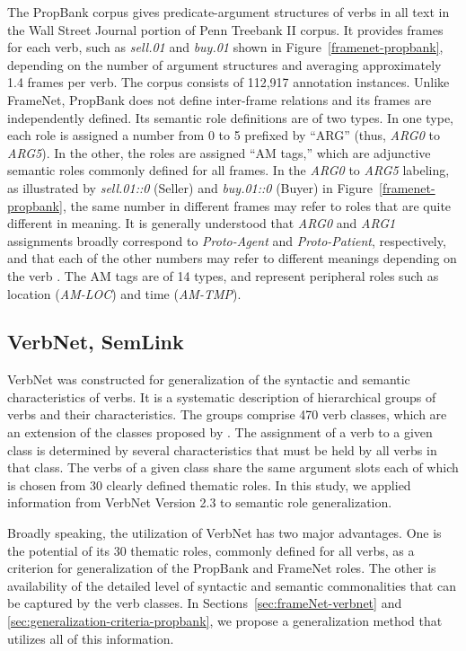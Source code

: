 \documentclass[english]{jnlp_1.4_rep}
\begin{document}
The PropBank corpus gives predicate-argument structures of verbs in all text in the Wall Street Journal portion of Penn Treebank II corpus. It provides frames for each verb, such as {\it sell.01} and {\it buy.01} shown in Figure~\ref{framenet-propbank}, depending on the number of argument structures and averaging approximately 1.4 frames per verb. The corpus consists of 112,917 annotation instances. Unlike FrameNet, PropBank does not define inter-frame relations and its frames are independently defined. Its semantic role definitions are of two types. In one type, each role is assigned a number from 0 to 5 prefixed by ``ARG'' (thus, {\it ARG0} to {\it ARG5}). In the other, the roles are assigned ``AM tags,'' which are adjunctive semantic roles commonly defined for all frames. In the {\it ARG0} to {\it ARG5} labeling, as illustrated by {\it sell.01::0} (Seller) and {\it buy.01::0} (Buyer) in Figure~\ref{framenet-propbank}, the same number in different frames may refer to roles that are quite different in meaning. It is generally understood that {\it ARG0} and {\it ARG1} assignments broadly correspond to {\it Proto-Agent} and {\it Proto-Patient}, respectively, and that each of the other numbers may refer to different meanings depending on the verb \cite{Palmer:05,yi-loper-palmer:2007:main}. The AM tags are of 14 types, and represent peripheral roles such as location ({\it AM-LOC}) and time ({\it AM-TMP}).


\subsection{VerbNet, SemLink}
\label{sec:verbnet}

VerbNet \cite{kipper2000cbc} was constructed for generalization of the syntactic and semantic characteristics of verbs. It is a systematic description of hierarchical groups of verbs and their characteristics. The groups comprise 470 verb classes, which are an extension of the classes proposed by . The assignment of a verb to a given class is determined by several characteristics that must be held by all verbs in that class. The verbs of a given class share the same argument slots each of which is chosen from 30 clearly defined thematic roles. In this study, we applied information from VerbNet Version 2.3 to semantic role generalization.

Broadly speaking, the utilization of VerbNet has two major advantages. One is the potential of its 30 thematic roles, commonly defined for all verbs, as a criterion for generalization of the PropBank and FrameNet roles. The other is availability of the detailed level of syntactic and semantic commonalities that can be captured by the verb classes. In Sections~\ref{sec:frameNet-verbnet} and \ref{sec:generalization-criteria-propbank}, we propose a generalization method that utilizes all of this information.
\end{document}
